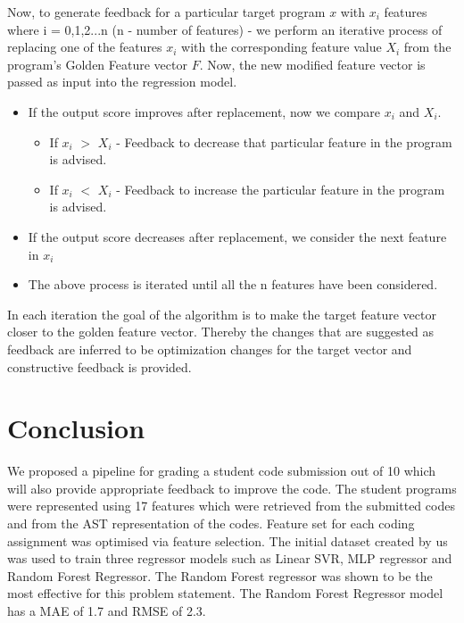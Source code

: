 \documentclass[conference]{IEEEtran}
\begin{document}
Now, to generate feedback for a particular target program $x$ with $x_{i}$ features where i = 0,1,2...n (n - number of features) - we perform an iterative process of replacing one of the features $x_{i}$ with the corresponding feature value $X_{i}$ from the program's Golden Feature vector $F$. Now, the new modified feature vector is passed as input into the regression model. 

\begin{itemize}

    \item If the output score improves after replacement, now we compare $x_{i}$ and $X_{i}$.

        \begin{itemize}
                \item If $x_{i}$ $>$ $X_{i}$ - Feedback to decrease that particular feature in the program is advised. 
                \item If $x_{i}$ $<$ $X_{i}$ - Feedback to increase the particular feature in the program is advised.
        \end{itemize}
        
    \item If the output score decreases after replacement, we consider the next feature in $x_{i}$
    
    \item The above process is iterated until all the n features have been considered. 

\end{itemize}

In each iteration the goal of the algorithm is to make the target feature vector closer to the golden feature vector. Thereby the changes that are suggested as feedback are inferred to be optimization changes for the target vector and constructive feedback is provided. 

\section{Conclusion }

We proposed a pipeline for grading a student code submission out of 10
which will also provide appropriate feedback to improve the code. The student programs were represented using 17 features which were retrieved from the submitted codes and from the AST representation of the codes. Feature set for each coding
assignment was optimised via feature selection. The initial dataset
created by us was used to train three regressor models such as Linear SVR, MLP regressor and Random Forest
Regressor. The Random Forest regressor was shown to be the most
effective for this problem statement. The Random Forest Regressor model
has a MAE of 1.7 and RMSE of 2.3.
\end{document}
